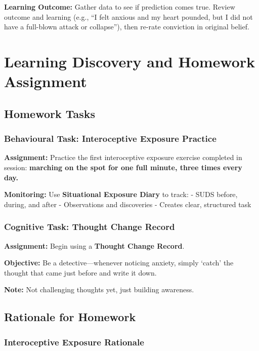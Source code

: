 \documentclass[
  american,
  letterpaper,
  DIV=11,
  numbers=noendperiod]{scrartcl}
\begin{document}
\textbf{Learning Outcome:} Gather data to see if prediction comes true.
Review outcome and learning (e.g., ``I felt anxious and my heart
pounded, but I did not have a full-blown attack or collapse''), then
re-rate conviction in original belief.

\section{Learning Discovery and Homework
Assignment}\label{learning-discovery-and-homework-assignment}

\subsection{Homework Tasks}\label{homework-tasks}

\subsubsection{Behavioural Task: Interoceptive Exposure
Practice}\label{behavioural-task-interoceptive-exposure-practice}

\textbf{Assignment:} Practice the first interoceptive exposure exercise
completed in session: \textbf{marching on the spot for one full minute,
three times every day.}

\textbf{Monitoring:} Use \textbf{Situational Exposure Diary} to track: -
SUDS before, during, and after - Observations and discoveries - Creates
clear, structured task

\subsubsection{Cognitive Task: Thought Change
Record}\label{cognitive-task-thought-change-record}

\textbf{Assignment:} Begin using a \textbf{Thought Change Record}.

\textbf{Objective:} Be a detective---whenever noticing anxiety, simply
`catch' the thought that came just before and write it down.

\textbf{Note:} Not challenging thoughts yet, just building awareness.

\subsection{Rationale for Homework}\label{rationale-for-homework}

\subsubsection{Interoceptive Exposure
Rationale}\label{interoceptive-exposure-rationale}
\end{document}
